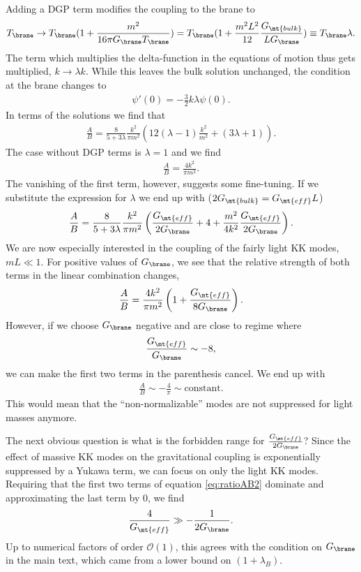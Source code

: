 Adding a DGP term modifies the coupling to the brane to
\begin{align}
T_\brane \to T_\brane (1 + \frac{m^2}{16 \pi G_\brane T_\brane}) = T_\brane (1 + \frac{m^2 L^2}{12} \frac{G_\mt{bulk}}{L G_\brane}) \equiv T_\brane \lambda.
\end{align}
The term which multiplies the delta-function in the equations of motion thus gets multiplied, $k \to \lambda k$. While this leaves the bulk solution unchanged, the condition at the brane changes to
\begin{align}
\psi'(0) = - \frac 3 2 k \lambda \psi(0).
\end{align}
In terms of the solutions we find that
\begin{align}
\frac A B = \frac 8 {5 + 3\lambda} \frac{k^2}{\pi m^2} \left(12 (\lambda - 1) \frac {k^2}{m^2} + (3 \lambda + 1) \right).
\end{align}
The case without DGP terms is $\lambda = 1$ and we find
\begin{align}
\frac A B = \frac{4 k^2}{\pi m^2}.
\end{align}
The vanishing of the first term, however, suggests some fine-tuning.
If we substitute the expression for $\lambda$ we end up with ($2G_\mt{bulk} = G_\mt{eff} L$)
\begin{align}
\label{eq:ratioAB2}
\frac A B = \frac 8 {5 + 3\lambda} \frac{k^2}{\pi m^2} \left(\frac{G_\mt{eff}}{2 G_\brane} + 4 + \frac{m^2}{4 k^2} \frac{G_\mt{eff}}{2 G_\brane} \right).
\end{align}
We are now especially interested in the coupling of the fairly light KK modes, \ie $m L \ll 1$. For positive values of $G_\brane$, we see that the relative strength of both terms in the linear combination changes, 
\begin{align}
\frac A B = \frac{4 k^2}{\pi m^2} \left(1 + \frac{G_\mt{eff}}{8 G_\brane} \right).
\end{align}
However, if we choose $G_\brane$ negative and are close to regime where
\begin{align}
\frac{G_\mt{eff}}{G_\brane} \sim - 8, 
\end{align}
we can make the first two terms in the parenthesis cancel. We end up with 
\begin{align}
\frac A B \sim - \frac 4 \pi \sim \text{constant}.
\end{align}
This would mean that the ``non-normalizable'' modes are not suppressed for light masses anymore.

The next obvious question is what is the forbidden range for $\frac{G_\mt{eff}}{2 G_\brane}$? Since the effect of massive KK modes on the gravitational coupling is exponentially suppressed by a Yukawa term, we can focus on only the light KK modes. Requiring that the first two terms of equation \eqref{eq:ratioAB2} dominate and approximating the last term by $0$, we find 
\begin{align}
 \frac{4}{G_\mt{eff}} \gg - \frac{1}{2 G_\brane}.
\end{align}
Up to numerical factors of order $\mathcal O(1)$, this agrees with the condition on $G_\brane$ in the main text, which came from a lower bound on $(1+\lambda_B)$.




